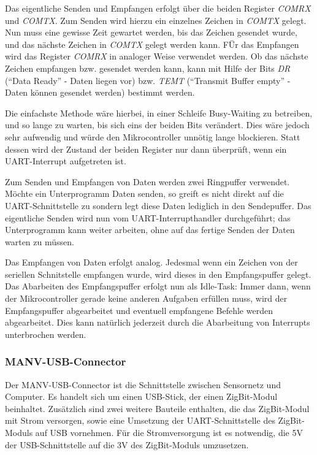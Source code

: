 Das eigentliche Senden und Empfangen erfolgt über die beiden Register \textsl{COMRX} und \textsl{COMTX}.
Zum Senden wird hierzu ein einzelnes Zeichen in \textsl{COMTX} gelegt. Nun muss eine gewisse Zeit gewartet
werden, bis das Zeichen gesendet wurde, und das nächste Zeichen in \textsl{COMTX} gelegt werden kann.
FÜr das Empfangen wird das Register \textsl{COMRX} in analoger Weise verwendet werden. Ob das nächste
Zeichen empfangen bzw. gesendet werden kann, kann mit Hilfe der Bits \textsl{DR} ("`Data Ready"' - Daten liegen vor)
bzw. \textsl{TEMT} ("`Transmit Buffer empty"' - Daten können gesendet werden) bestimmt werden.

Die einfachste Methode wäre hierbei, in einer Schleife Busy-Waiting zu betreiben, und so lange zu warten,
bis sich eins der beiden Bits verändert. Dies wäre jedoch sehr aufwendig und würde den Mikrocontroller 
unnötig lange blockieren. Statt dessen wird der Zustand der beiden Register nur dann überprüft, wenn ein 
UART-Interrupt aufgetreten ist.

Zum Senden und Empfangen von Daten werden zwei Ringpuffer verwendet. Möchte ein Unterprogramm Daten senden,
so greift es nicht direkt auf die UART-Schnittstelle zu sondern legt diese Daten lediglich in den Sendepuffer.
Das eigentliche Senden wird nun vom UART-Interrupthandler durchgeführt; das Unterprogramm kann weiter arbeiten,
ohne auf das fertige Senden der Daten warten zu müssen.

Das Empfangen von Daten erfolgt analog. Jedesmal wenn ein Zeichen von der seriellen Schnitstelle empfangen
wurde, wird dieses in den Empfangspuffer gelegt. Das Abarbeiten des Empfangspuffer erfolgt nun als Idle-Task:
Immer dann, wenn der Mikrocontroller gerade keine anderen Aufgaben erfüllen muss, wird der Empfangspuffer
abgearbeitet und eventuell empfangene Befehle werden abgearbeitet. Dies kann natürlich jederzeit durch 
die Abarbeitung von Interrupts unterbrochen werden.

\subsubsection{MANV-USB-Connector}

Der MANV-USB-Connector ist die Schnittstelle zwischen Sensornetz und Computer. Es handelt sich um einen USB-Stick, der einen
ZigBit-Modul beinhaltet. Zusätzlich sind zwei weitere Bauteile enthalten, die das ZigBit-Modul mit Strom versorgen, sowie eine
Umsetzung der UART-Schnittstelle des ZigBit-Moduls auf USB vornehmen. Für die Stromversorgung ist es notwendig, die 5V der
USB-Schnittstelle auf die 3V des ZigBit-Moduls umzusetzen.

